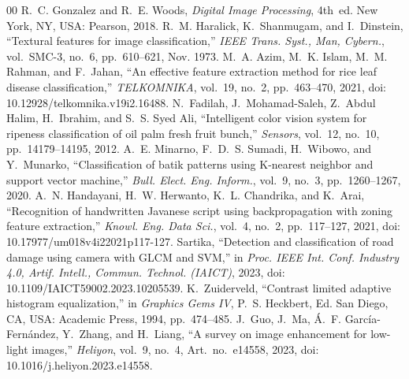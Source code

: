 \documentclass[conference]{IEEEtran}
\begin{document}
\begin{thebibliography}{00}
 R.~C. Gonzalez and R.~E. Woods, \emph{Digital Image Processing}, 4th~ed. New York, NY, USA: Pearson, 2018.
 R.~M. Haralick, K.~Shanmugam, and I.~Dinstein, ``Textural features for image classification,'' \emph{IEEE Trans. Syst., Man, Cybern.}, vol.~SMC-3, no.~6, pp.~610--621, Nov. 1973.
 M.~A. Azim, M.~K. Islam, M.~M. Rahman, and F.~Jahan, ``An effective feature extraction method for rice leaf disease classification,'' \emph{TELKOMNIKA}, vol.~19, no.~2, pp.~463--470, 2021, doi: 10.12928/telkomnika.v19i2.16488.
 N.~Fadilah, J.~Mohamad-Saleh, Z.~Abdul Halim, H.~Ibrahim, and S.~S. Syed Ali, ``Intelligent color vision system for ripeness classification of oil palm fresh fruit bunch,'' \emph{Sensors}, vol.~12, no.~10, pp.~14179--14195, 2012.
 A.~E. Minarno, F.~D.~S. Sumadi, H.~Wibowo, and Y.~Munarko, ``Classification of batik patterns using K-nearest neighbor and support vector machine,'' \emph{Bull. Elect. Eng. Inform.}, vol.~9, no.~3, pp.~1260--1267, 2020.
 A.~N. Handayani, H.~W. Herwanto, K.~L. Chandrika, and K.~Arai, ``Recognition of handwritten Javanese script using backpropagation with zoning feature extraction,'' \emph{Knowl. Eng. Data Sci.}, vol.~4, no.~2, pp.~117--127, 2021, doi: 10.17977/um018v4i22021p117-127.
 Sartika, ``Detection and classification of road damage using camera with GLCM and SVM,'' in \emph{Proc. IEEE Int. Conf. Industry 4.0, Artif. Intell., Commun. Technol. (IAICT)}, 2023, doi: 10.1109/IAICT59002.2023.10205539.
 K.~Zuiderveld, ``Contrast limited adaptive histogram equalization,'' in \emph{Graphics Gems IV}, P.~S. Heckbert, Ed. San Diego, CA, USA: Academic Press, 1994, pp.~474--485.
 J.~Guo, J.~Ma, \'A.~F. Garc\'ia-Fern\'andez, Y.~Zhang, and H.~Liang, ``A survey on image enhancement for low-light images,'' \emph{Heliyon}, vol.~9, no.~4, Art.~no.~e14558, 2023, doi: 10.1016/j.heliyon.2023.e14558.
\end{thebibliography}
\end{document}
